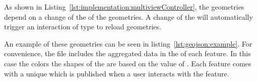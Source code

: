 As shown in Listing~\ref{lst:implementation:multiviewController}, the geometries depend on a change of the  of the geometries.
A change of the  will automatically trigger an interaction of type  to reload geometries.

An example of these geometries can be seen in listing~\ref{lst:geojson:example}.
For convenience, the file includes the aggregated data in the  of each feature.
In this case the colors the shapes of the \tmap{} are based on the value of .
Each feature comes with a unique  which is published when a user interacts with the feature.






